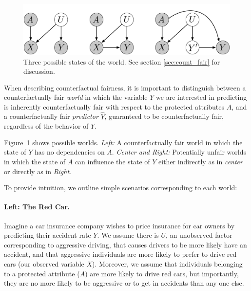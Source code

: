 \begin{figure}[th!]
\begin{center}
\vspace{-2ex}
\centerline{\includegraphics[width=\textwidth]{simple_models_no_q}}
\vspace{-2ex}
\caption{Three possible states of the world.\label{figure.simple_models} See section \ref{sec:count_fair} for discussion.}
\vspace{-2ex}
\end{center}
\end{figure}

When describing counterfactual fairness, it is important to
distinguish between a counterfactually fair {\em world} in which the
variable $Y$ we are interested in predicting is inherently
counterfactually fair with respect to the protected attributes $A$,
and a counterfactually fair {\em predictor} $\hat Y$, guaranteed to
be counterfactually fair, regardless of the behavior of $Y$.

Figure~\ref{figure.simple_models} shows possible worlds. {\em Left:} A
counterfactually fair world in which the state of $Y$ has no
dependencies on $A$. {\em Center and Right:} Potentially unfair worlds
in which the state of $A$ can influence the state of $Y$ either
indirectly as in {\em center} or directly as in {\em Right}.

To provide intuition, we outline simple scenarios corresponding to each world:
\paragraph{Left: The Red Car.}
Imagine a car insurance company wishes to price insurance for car owners by
predicting their accident rate $Y$. We assume there is $U$, an
unobserved factor corresponding to aggressive driving, that causes
drivers to be more likely have an accident, and that aggressive
individuals are more likely to prefer to drive red cars (our observed
variable $X$). Moreover, we assume that individuals belonging to a
protected attribute ($A$) are more likely to drive red cars, but
importantly, they are no more likely to be aggressive or to get in
accidents than any one else.


